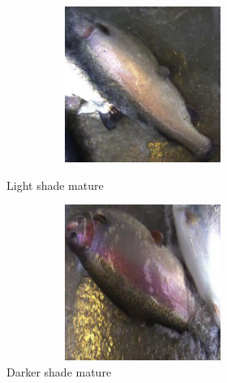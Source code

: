 \begin{figure}[H]
  \centering
  \begin{minipage}[b]{0.4\textwidth}
    \centering
    \includegraphics[width=3.5in, height=2in, keepaspectratio]{Figures/lightshademature.jpg}
    \caption{Light shade mature}
    \label{fig:maturelight}
  \end{minipage}
  \hfill
  \begin{minipage}[b]{0.4\textwidth}
    \centering
    \includegraphics[width=3.5in, height=2in, keepaspectratio]{Figures/darkshademature.jpg}
    \caption{Darker shade mature}
    \label{fig:maturedark}
  \end{minipage}
\end{figure}

